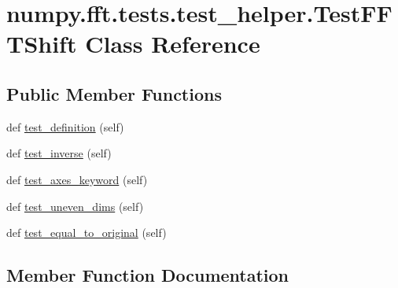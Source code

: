\hypertarget{classnumpy_1_1fft_1_1tests_1_1test__helper_1_1TestFFTShift}{}\section{numpy.\+fft.\+tests.\+test\+\_\+helper.\+Test\+F\+F\+T\+Shift Class Reference}
\label{classnumpy_1_1fft_1_1tests_1_1test__helper_1_1TestFFTShift}
\subsection*{Public Member Functions}
\begin{DoxyCompactItemize}
\item 
def \hyperlink{classnumpy_1_1fft_1_1tests_1_1test__helper_1_1TestFFTShift_a088665241240ead452e4a5975c3d4a3b}{test\+\_\+definition} (self)
\item 
def \hyperlink{classnumpy_1_1fft_1_1tests_1_1test__helper_1_1TestFFTShift_a0e084a9536a00079e9a7b2f256ef49cd}{test\+\_\+inverse} (self)
\item 
def \hyperlink{classnumpy_1_1fft_1_1tests_1_1test__helper_1_1TestFFTShift_aff6ea920c4d96023912bd6921eddea69}{test\+\_\+axes\+\_\+keyword} (self)
\item 
def \hyperlink{classnumpy_1_1fft_1_1tests_1_1test__helper_1_1TestFFTShift_a7d7473d03a73f3c03847ea81cb5e4d16}{test\+\_\+uneven\+\_\+dims} (self)
\item 
def \hyperlink{classnumpy_1_1fft_1_1tests_1_1test__helper_1_1TestFFTShift_a335374d8ec19d605f9d678e2c6eeb5c6}{test\+\_\+equal\+\_\+to\+\_\+original} (self)
\end{DoxyCompactItemize}


\subsection{Member Function Documentation}
\mbox{\label{classnumpy_1_1fft_1_1tests_1_1test__helper_1_1TestFFTShift_aff6ea920c4d96023912bd6921eddea69}} 
